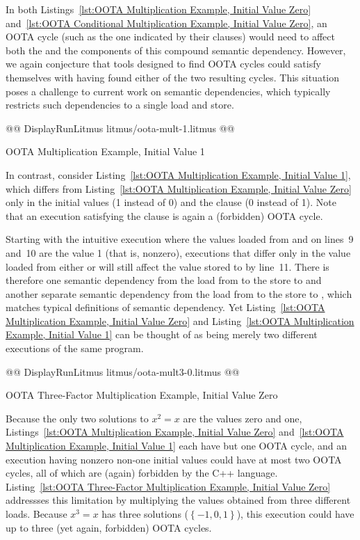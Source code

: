 \documentclass[10]{article}
\begin{document}
In both
Listings~\ref{lst:OOTA Multiplication Example, Initial Value Zero}
and~\ref{lst:OOTA Conditional Multiplication Example, Initial Value Zero},
an OOTA cycle (such as the one indicated by their  clauses)
would need to affect both the  and the  components of this
compound semantic dependency.
However, we again conjecture that tools designed to find OOTA cycles could
satisfy themselves with having found either of the two resulting cycles.
This situation poses a challenge to current work on semantic dependencies,
which typically restricts such dependencies to a single load and store.

\begin{listing}[tbp]
@@ DisplayRunLitmus litmus/oota-mult-1.litmus @@
\caption{OOTA Multiplication Example, Initial Value 1}
\label{lst:OOTA Multiplication Example, Initial Value 1}
\end{listing}

In contrast, consider
Listing~\ref{lst:OOTA Multiplication Example, Initial Value 1},
which differs from
Listing~\ref{lst:OOTA Multiplication Example, Initial Value Zero}
only in the initial values (1 instead of 0) and the 
clause (0 instead of 1).
Note that an execution satisfying the  clause is again
a (forbidden) OOTA cycle.

Starting with the intuitive execution where the values loaded from 
and  on lines~9 and~10 are the value 1 (that is, nonzero), executions
that differ only in the value loaded from either  or  will
still affect the value stored to  by line~11.
There is therefore one semantic dependency from the load from 
to the store to  and another separate semantic dependency from
the load from  to the store to , which matches typical
definitions of semantic dependency.
Yet
Listing~\ref{lst:OOTA Multiplication Example, Initial Value Zero}
and
Listing~\ref{lst:OOTA Multiplication Example, Initial Value 1}
can be thought of as being merely two different executions of the same
program.

\begin{listing}[tbp]
@@ DisplayRunLitmus litmus/oota-mult3-0.litmus @@
\caption{OOTA Three-Factor Multiplication Example, Initial Value Zero}
\label{lst:OOTA Three-Factor Multiplication Example, Initial Value Zero}
\end{listing}

Because the only two solutions to $x^2 = x$ are the values zero and one,
Listings~\ref{lst:OOTA Multiplication Example, Initial Value Zero}
and~\ref{lst:OOTA Multiplication Example, Initial Value 1}
each have but one OOTA cycle, and an execution having nonzero non-one
initial values could have at most two OOTA cycles, all of which are
(again) forbidden by the C++ language.
Listing~\ref{lst:OOTA Three-Factor Multiplication Example, Initial Value Zero}
addressses this limitation by multiplying the values obtained from three
different loads.
Because $x^3 = x$ has three solutions ($\left\{ -1, 0, 1 \right\}$),
this execution could have up to three (yet again, forbidden) OOTA cycles.
\end{document}
